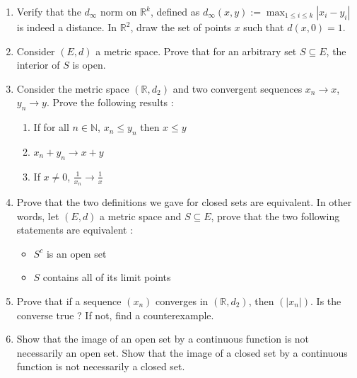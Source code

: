 \documentclass[11pt,letterpaper]{scrartcl}
\newcommand{\reals}{\mathbb{R}}
\newcommand{\naturals}{\mathbb{N}}
\begin{document}
\begin{enumerate}
	\item Verify that the $d_\infty$ norm on $\reals^k$, defined as $d_\infty(x,y):=\max_{1\leq i \leq k} |x_i-y_i|$ is indeed a distance. In $\reals^2$, draw the set of points $x$ such that $d(x,0)=1$.

	\item Consider $(E,d)$ a metric space. Prove that for an arbitrary set $S \subseteq E$, the interior of $S$ is open.

	\item Consider the metric space $(\reals,d_2)$ and two convergent sequences $x_n \rightarrow x$, $y_n \rightarrow y$. Prove the following results :
	\begin{enumerate}[label=\alph*.]
		\item If for all $n \in \naturals$, $x_n \leq y_n$ then $x \leq y$
		\item $x_n + y_n \rightarrow x + y$
		\item If $x \neq 0$, $\frac{1}{x_n} \rightarrow \frac{1}{x}$
	\end{enumerate}

	\item Prove that the two definitions we gave for closed sets are equivalent. In other words, let $(E,d)$ a metric space and $S \subseteq E$, prove that the two following statements are equivalent :
	\begin{itemize}
		\item $S^c$ is an open set
		\item $S$ contains all of its limit points
	\end{itemize}

	\item Prove that if a sequence $(x_n)$ converges in $(\reals,d_2)$, then $(|x_n|)$. Is the converse true ? If not, find a counterexample.

	\item Show that the image of an open set by a continuous function is not necessarily an open set. Show that the image of a closed set by a continuous function is not necessarily a closed set.  
	

\end{enumerate}
\end{document}

